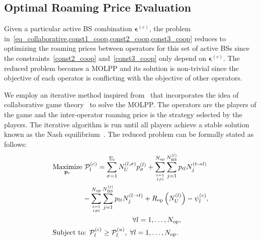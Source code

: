 \documentclass[10pt, letter, twocolumn]{IEEEtran}
\begin{document}
\subsection{Optimal Roaming Price Evaluation} \label{roaming_price_selection}
Given a particular active BS combination $\boldsymbol{\epsilon}^{(c)}$, the problem in~\cref{eq_collaborative,const1_coop,const2_coop,const3_coop} reduces to optimizing the roaming prices between operators for this set of active BSs since the constraints~\eqref{const2_coop} and~\eqref{const3_coop} only depend on $\boldsymbol{\epsilon}^{(c)}$. The reduced problem becomes a MOLPP and its solution is non-trivial since the objective of each operator is conflicting with the objective of other operators.

We employ an iterative method inspired from~\cite{MOLPP_iterative} that incorporates the idea of collaborative game theory~\cite{coalitional_game_theory} to solve the MOLPP. The operators are the players of the game and the inter-operator roaming price is the strategy selected by the players. The iterative algorithm is run until all players achieve a stable solution known as the Nash equilibrium~\cite{nash_equilibria}. The reduced problem can be formally stated as follows:
\normalsize
\begin{align}
&\underset{\mathbf{p}_{r} }{\text{Maximize}} \,\,{\mathcal P}_l^{(c)} = \sum_{\sigma=1}^{\Sigma_l}N_U^{(l,\sigma)} p^{(l)}_\sigma+\sum_{t=1\atop  t\neq l}^{{N_{\text{op}}}}\sum_{j=1}^{N_{\text{BS}}^{(l)}} p_{tl} N_{j}^{(t \rightarrow l)} \nonumber\\
&\hspace{1.5cm}- \sum_{t=1\atop  t\neq l}^{{N_{\text{op}}}}\sum_{j=1}^{N_{\text{BS}}^{(t)}}p_{lt} N_{j}^{(l \rightarrow t)} +R_{\mathrm{op}}\left(N_U^{(l)}\right)-\psi_{l}^{(c)}, \notag\\& \hspace{4cm}  \hfill{\forall l = 1,\ldots,N_{\text{op}}, }  \label{reduced_eq_collaborative} \\
&\text{Subject to:}\;\, \mathcal{P}_{l}^{(c)} \geq \mathcal{P}_{l}^{(u)}, \; \forall l = 1,\ldots, N_{\text{op}}.  \label{reduced_const1}
\end{align}
\normalsize
\end{document}
